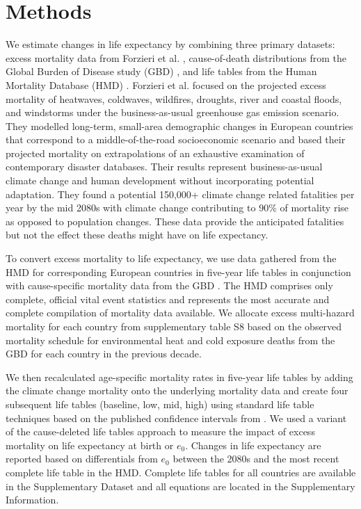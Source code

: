 \documentclass[12pt,]{article}
\begin{document}
\section{Methods}\label{methods}

We estimate changes in life expectancy by combining three primary
datasets: excess mortality data from Forzieri et al.
\citep{forzieri2017increasing}, cause-of-death distributions from the
Global Burden of Disease study (GBD) \citep{GBD, wang2012age}, and life
tables from the Human Mortality Database (HMD) \citep{HMD}. Forzieri et
al. \citep{forzieri2017increasing} focused on the projected excess
mortality of heatwaves, coldwaves, wildfires, droughts, river and
coastal floods, and windstorms under the business-as-usual greenhouse
gas emission scenario. They modelled long-term, small-area demographic
changes in European countries that correspond to a middle-of-the-road
socioeconomic scenario and based their projected mortality on
extrapolations of an exhaustive examination of contemporary disaster
databases. Their results represent business-as-usual climate change and
human development without incorporating potential adaptation. They found
a potential 150,000+ climate change related fatalities per year by the
mid 2080s with climate change contributing to 90\% of mortality rise as
opposed to population changes. These data provide the anticipated
fatalities but not the effect these deaths might have on life
expectancy.

To convert excess mortality to life expectancy, we use data gathered
from the HMD \citep{HMD} for corresponding European countries in
five-year life tables in conjunction with cause-specific mortality data
from the GBD \citep{GBD, wang2012age}. The HMD comprises only complete,
official vital event statistics and represents the most accurate and
complete compilation of mortality data available. We allocate excess
multi-hazard mortality for each country from supplementary table S8
\citep{forzieri2017increasing} based on the observed mortality schedule
for environmental heat and cold exposure deaths from the GBD for each
country in the previous decade.

We then recalculated age-specific mortality rates in five-year life
tables by adding the climate change mortality onto the underlying
mortality data and create four subsequent life tables (baseline, low,
mid, high) using standard life table techniques \citep{wunsch2013life}
based on the published confidence intervals from
\citep{forzieri2017increasing}. We used a variant of the cause-deleted
life tables approach
\citep{brand2005approximations, beltran2008integrated} to measure the
impact of excess mortality on life expectancy at birth or \(e_0\).
Changes in life expectancy are reported based on differentials from
\(e_0\) between the 2080s and the most recent complete life table in the
HMD. Complete life tables for all countries are available in the
Supplementary Dataset and all equations are located in the Supplementary
Information.
\end{document}
